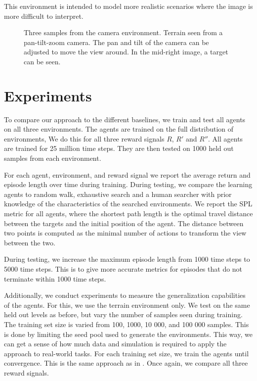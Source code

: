 This environment is intended to model more realistic scenarios where the image is more difficult to interpret.

\begin{figure}
    \centering
    
    \label{fig:camera}
    \caption[Camera environment]{Three samples from the camera environment. Terrain seen from a pan-tilt-zoom camera. The pan and tilt of the camera can be adjusted to move the view around. In the mid-right image, a target can be seen.}
\end{figure}

\section{Experiments}
\label{sec:experiments}

To compare our approach to the different baselines,
we train and test all agents on all three environments.
The agents are trained on the full distribution of environments,
We do this for all three reward signals \(R\), \(R'\) and \(R''\).
All agents are trained for 25 million time steps.
They are then tested on 1000 held out samples from each environment.

For each agent, environment, and reward signal we report the average return and episode length over time during training.
During testing, we compare the learning agents to random walk, exhaustive search and a human searcher with prior knowledge of the characteristics of the searched environments.
We report the SPL metric for all agents, where the shortest path length is the optimal travel distance between the targets and the initial position of the agent.
The distance between two points is computed as the minimal number of actions to transform the view between the two.

During testing, we increase the maximum episode length from 1000 time steps to 5000 time steps.
This is to give more accurate metrics for episodes that do not terminate within 1000 time steps. 

Additionally, we conduct experiments to measure the generalization capabilities of the agents.
For this, we use the terrain environment only.
We test on the same held out levels as before, but vary the number of samples seen during training.
The training set size is varied from 100, 1000, 10 000, and 100 000 samples.
This is done by limiting the seed pool used to generate the environments.
This way, we can get a sense of how much data and simulation is required to apply the approach to real-world tasks.
For each training set size, we train the agents until convergence.
This is the same approach as in \cite{cobbe_procgen_2020}.
Once again, we compare all three reward signals.

